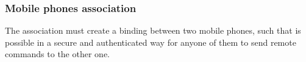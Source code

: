 \subsubsection{Mobile phones association} 
\small{The association must create a binding between two mobile phones, such that is possible in a secure and authenticated way for anyone of them to send remote commands to the other one.}